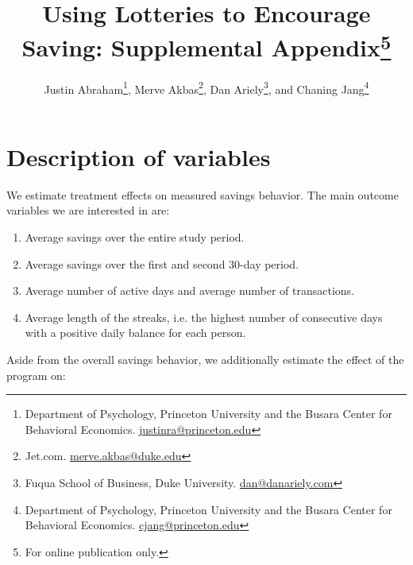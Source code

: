 \documentclass[11pt]{article}
\begin{document}
\title{Using Lotteries to Encourage Saving: Supplemental Appendix\thanks{For online publication only.}}

\author{Justin Abraham\thanks{Department of Psychology, Princeton University and the Busara Center for Behavioral Economics. \protect\href{mailto:justinra@princeton.edu}{justinra@princeton.edu}}, Merve Akbas\thanks{Jet.com. \protect\href{mailto:merve.akbas@duke.edu}{merve.akbas@duke.edu}}, Dan Ariely\thanks{Fuqua School of Business, Duke University. \protect\href{mailto:dan@danariely.com}{dan@danariely.com}}, and Chaning Jang\thanks{Department of Psychology, Princeton University and the Busara Center for Behavioral Economics. \protect\href{mailto:cjang@princeton.edu}{cjang@princeton.edu}}} %

\maketitle

\newpage

\tableofcontents

\newpage

\appendix

\section{Description of variables}

	We estimate treatment effects on measured savings behavior. The main outcome variables we are interested in are:

		\begin{enumerate}
		\item Average savings over the entire study period.
		\item Average savings over the first and second 30-day period.
		\item Average number of active days and average number of transactions.
		\item Average length of the streaks, i.e. the highest number of consecutive days with a positive daily balance for each person.
		\end{enumerate}

	Aside from the overall savings behavior, we additionally estimate the effect of the program on:
\end{document}
